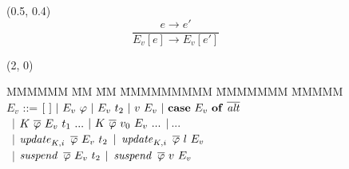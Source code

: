 \medskip
\begin{figure}[ht!]

\begin{textblock}{3}(0.5, 0.4)
$$	\frac	{e \longrightarrow e'}
		{E_v[e] \longrightarrow E_v[e']}
$$
\end{textblock}


\begin{textblock}{1}(2, 0)
\begin{tabbing}
MMMMMM \= MM  	\= MM		\= MMMMMMMMM \= MMMMMMM \= MMMMM \kill
\> $E_v$ \> ::=		\> $[\ ] \ 
				| \ E_v \ \varphi \ 
				| \ E_v \ t_2 \
				| \ v \ E_v \
				| \ \kcase \ E_v \ \kof \ \ov{\ialt}$ 
\\[0.5ex]
\>	\> \ $|$	\> $K \ \overline{\varphi} \ E_v \ t_1 \ ...$ 
			\> $| \ K \ \ov{\varphi} \ v_0 \ E_v \ ...$
			\> $| \ ...$
\\[0.5ex]
\>	\> \ $|$	\> $\iupdate_{K,i} \ \ov{\varphi} \ E_v \ t_2$
			\> $| \ \operatorname{\mathit{update}}_{K,i} \ \overline{\varphi} \ l \ E_v$ 
\\[0.5ex]
\>	\> \ $|$	\> $\operatorname{\mathit{suspend}} \ \overline{\varphi} \ E_v \ t_2$
			\> $| \ \isuspend \ \ov{\varphi} \ v \ E_v$
\end{tabbing}
\end{textblock}

\vspace{6em}


\end{figure}
